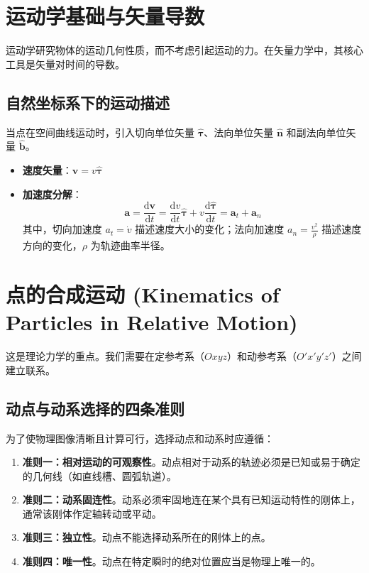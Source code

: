 \documentclass[12pt,a4paper]{article}
\newcommand{\vect}[1]{\mathbf{#1}}                   %
\newcommand{\unitv}[1]{\hat{\mathbf{#1}}}            %
\newcommand{\der}[2]{\frac{\mathrm{d} #1}{\mathrm{d} #2}}  %
\begin{document}
\section{运动学基础与矢量导数}
运动学研究物体的运动几何性质，而不考虑引起运动的力。在矢量力学中，其核心工具是矢量对时间的导数。

\subsection{自然坐标系下的运动描述}
当点在空间曲线运动时，引入切向单位矢量 $\unitv{\tau}$、法向单位矢量 $\unitv{n}$ 和副法向单位矢量 $\unitv{b}$。
\begin{itemize}
    \item \textbf{速度矢量}：$\vect{v} = v \unitv{\tau}$
    \item \textbf{加速度分解}：
    \begin{equation}
    \vect{a} = \der{\vect{v}}{t} = \der{v}{t}\unitv{\tau} + v\der{\unitv{\tau}}{t} = \vect{a}_t + \vect{a}_n
\end{equation}
    其中，切向加速度 $a_t = \dot{v}$ 描述速度大小的变化；法向加速度 $a_n = \frac{v^2}{\rho}$ 描述速度方向的变化，$\rho$ 为轨迹曲率半径。
\end{itemize}

\section{点的合成运动 (Kinematics of Particles in Relative Motion)}

这是理论力学的重点。我们需要在定参考系（$Oxyz$）和动参考系（$O'x'y'z'$）之间建立联系。

\subsection{动点与动系选择的四条准则}
为了使物理图像清晰且计算可行，选择动点和动系时应遵循：
\begin{enumerate}
    \item \textbf{准则一：相对运动的可观察性}。动点相对于动系的轨迹必须是已知或易于确定的几何线（如直线槽、圆弧轨道）。
    \item \textbf{准则二：动系固连性}。动系必须牢固地连在某个具有已知运动特性的刚体上，通常该刚体作定轴转动或平动。
    \item \textbf{准则三：独立性}。动点不能选择动系所在的刚体上的点。
    \item \textbf{准则四：唯一性}。动点在特定瞬时的绝对位置应当是物理上唯一的。
\end{enumerate}
\end{document}
